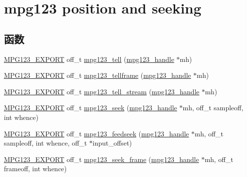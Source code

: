 \hypertarget{group__mpg123__seek}{}\section{mpg123 position and seeking}
\label{group__mpg123__seek}
\subsection*{函数}
\begin{DoxyCompactItemize}
\item 
\hyperlink{mpg123_8h_a2ba98cfba3f760879df70e755b2a61cc}{M\+P\+G123\+\_\+\+E\+X\+P\+O\+RT} off\+\_\+t \hyperlink{group__mpg123__seek_gaad30e14c278dde500e609af2971d7b44}{mpg123\+\_\+tell} (\hyperlink{group__mpg123__init_ga6728e2839a395f3a07d4514da659faca}{mpg123\+\_\+handle} $\ast$mh)
\item 
\hyperlink{mpg123_8h_a2ba98cfba3f760879df70e755b2a61cc}{M\+P\+G123\+\_\+\+E\+X\+P\+O\+RT} off\+\_\+t \hyperlink{group__mpg123__seek_gaab81ee3527294d01e2c10a10e91022ee}{mpg123\+\_\+tellframe} (\hyperlink{group__mpg123__init_ga6728e2839a395f3a07d4514da659faca}{mpg123\+\_\+handle} $\ast$mh)
\item 
\hyperlink{mpg123_8h_a2ba98cfba3f760879df70e755b2a61cc}{M\+P\+G123\+\_\+\+E\+X\+P\+O\+RT} off\+\_\+t \hyperlink{group__mpg123__seek_ga385bcc9fd3cec22289410828eac3938b}{mpg123\+\_\+tell\+\_\+stream} (\hyperlink{group__mpg123__init_ga6728e2839a395f3a07d4514da659faca}{mpg123\+\_\+handle} $\ast$mh)
\item 
\hyperlink{mpg123_8h_a2ba98cfba3f760879df70e755b2a61cc}{M\+P\+G123\+\_\+\+E\+X\+P\+O\+RT} off\+\_\+t \hyperlink{group__mpg123__seek_gabf7633e5765e35933e264f175f5fcf8c}{mpg123\+\_\+seek} (\hyperlink{group__mpg123__init_ga6728e2839a395f3a07d4514da659faca}{mpg123\+\_\+handle} $\ast$mh, off\+\_\+t sampleoff, int whence)
\item 
\hyperlink{mpg123_8h_a2ba98cfba3f760879df70e755b2a61cc}{M\+P\+G123\+\_\+\+E\+X\+P\+O\+RT} off\+\_\+t \hyperlink{group__mpg123__seek_gab0b0e6ed9e4ba14f1ca0c1dd83be6f57}{mpg123\+\_\+feedseek} (\hyperlink{group__mpg123__init_ga6728e2839a395f3a07d4514da659faca}{mpg123\+\_\+handle} $\ast$mh, off\+\_\+t sampleoff, int whence, off\+\_\+t $\ast$input\+\_\+offset)
\item 
\hyperlink{mpg123_8h_a2ba98cfba3f760879df70e755b2a61cc}{M\+P\+G123\+\_\+\+E\+X\+P\+O\+RT} off\+\_\+t \hyperlink{group__mpg123__seek_gada9748c253215a8669eab327dd00d447}{mpg123\+\_\+seek\+\_\+frame} (\hyperlink{group__mpg123__init_ga6728e2839a395f3a07d4514da659faca}{mpg123\+\_\+handle} $\ast$mh, off\+\_\+t frameoff, int whence)

\end{DoxyCompactItemize}
